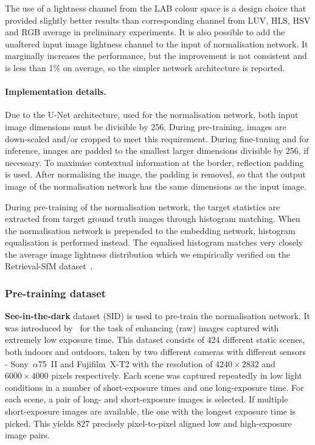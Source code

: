 The use of a lightness channel from the LAB colour space is a design choice that provided slightly better results than corresponding channel from LUV, HLS, HSV and RGB average in preliminary experiments. It is also possible to add the unaltered input image lightness channel to the input of normalisation network. It marginally increases the performance, but the improvement is not consistent and is less than 1\% on average, so the simpler network architecture is reported.

\paragraph{Implementation details.} Due to the U-Net architecture, used for the normalisation network, both input image dimensions must be divisible by 256. During pre-training, images are down-scaled and/or cropped to meet this requirement. During fine-tuning and for inference, images are padded to the smallest larger dimensions divisible by 256, if necessary. To maximise contextual information at the border, reflection padding is used. After normalising the image, the padding is removed, so that the output image of the normalisation network has the same dimensions as the input image.

During pre-training of the normalisation network, the target statistics are extracted from target ground truth images through histogram matching. When the normalisation network is prepended to the embedding network, histogram equalisation is performed instead. The equalised histogram matches very closely the average image lightness distribution which we empirically verified on the Retrieval-SfM dataset~\cite{Radenovic-TPAMI18}.


\subsubsection{Pre-training dataset}
{\bf See-in-the-dark} dataset (SID) is used to pre-train the normalisation network. It was introduced by~\cite{Chen-CVPR18} for the task of enhancing (raw) images captured with extremely low exposure time. This dataset consists of 424 different static scenes, both indoors and outdoors, taken by two different cameras with different sensors - Sony~$\alpha$75~II and Fujifilm~X-T2 with the resolution of $4240 \times 2832$ and $6000 \times 4000$ pixels respectively. Each scene was captured repeatedly in low light conditions in a number of short-exposure times and one long-exposure time. For each scene, a pair of long- and short-exposure images is selected. If multiple short-exposure images are available, the one with the longest exposure time is picked. This yields 827 precisely pixel-to-pixel aligned low and high-exposure image pairs.

